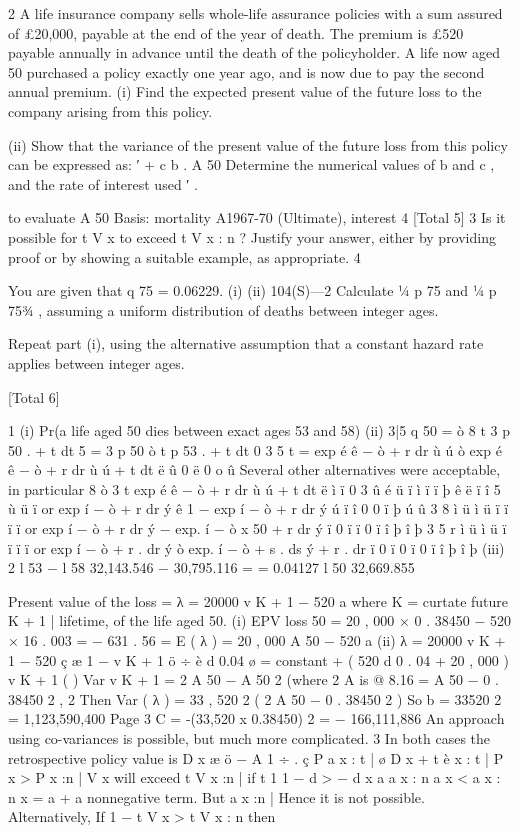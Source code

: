\documentclass[a4paper,12pt]{article}
\begin{document}
2
A life insurance company sells whole-life assurance policies with a sum assured of
£20,000, payable at the end of the year of death. The premium is £520 payable
annually in advance until the death of the policyholder.
A life now aged 50 purchased a policy exactly one year ago, and is now due to pay
the second annual premium.
(i) Find the expected present value of the future loss to the company arising
from this policy.

(ii) Show that the variance of the present value of the future loss from this
policy can be expressed as:
′ + c
b . A 50
Determine the numerical values of b and c , and the rate of interest used
′ .

to evaluate A 50
Basis: mortality A1967-70 (Ultimate), interest 4%
[Total 5]
3
Is it possible for t V x to exceed t V x : n ? Justify your answer, either by providing
proof or by showing a suitable example, as appropriate.
4

You are given that q 75 = 0.06229.
(i)
(ii)
104(S)—2
Calculate 1⁄4 p 75 and 1⁄4 p 753⁄4 , assuming a uniform distribution of deaths
between integer ages.

Repeat part (i), using the alternative assumption that a constant hazard
rate applies between integer ages.

[Total 6]



1
(i) Pr(a life aged 50 dies between exact ages 53 and 58)
(ii) 3|5 q 50
= ò
8
t
3
p 50 .  + t dt
5
= 3 p 50 ò t p 53 .  + t dt
0
3
5
t
= exp é ê − ò  + r dr ù ú ò exp é ê − ò  + r dr ù ú  + t dt
ë
û
0
ë
0
o
û
Several other alternatives were acceptable, in particular
8
ò 3
t
exp é ê − ò  + r dr ù ú  + t dt
ë
ì
ï
0
3
û
é
ü
ï ì
ï
ï
þ ê
ë ï
î
5
ù
ü
ï
or exp í − ò  + r dr ý ê 1 − exp í − ò  + r dr ý ú
ï
î
0
0
ï
þ ú
û
3
8
ì
ü
ì
ü
ï
ï
ï
ï
or exp í − ò  + r dr ý − exp. í − ò \mu x 50 + r dr ý
ï 0
ï
ï 0
ï
î
þ
î
þ
3
5
r
ì
ü
ì
ü
ï
ï
ï
ï
or exp í − ò  + r . dr ý ò exp. í − ò  + s . ds ý  + r . dr
ï 0
ï 0
ï 0
ï
î
þ
î
þ
(iii)
2
l 53 − l 58 32,143.546 − 30,795.116
=
= 0.04127
l 50
32,669.855
 
Present value of the loss = λ = 20000 v K + 1 − 520 a
where K = curtate future
K + 1 |
lifetime, of the life aged 50.
(i) EPV loss
  50 = 20 , 000 × 0 . 38450 − 520 × 16 . 003 = − 631 . 56
= Ε ( λ ) = 20 , 000 A 50 − 520 a
(ii) λ = 20000 v K + 1 − 520 ç
æ 1 − v K + 1 ö
÷
è d 0.04 ø
= constant + ( 520 d 0 . 04 + 20 , 000 ) v K + 1
(
)
Var v K + 1 = 2 A 50 − A 50 2 (where 2 A is @ 8.16%
= A 50 − 0 . 38450 2 ,
2
Then Var ( λ ) = 33 , 520 2
(
2
A 50 − 0 . 38450 2
)
So b = 33520 2 = 1,123,590,400
Page 3%
C = -(33,520 x 0.38450) 2 = − 166,111,886
An approach using co-variances is possible, but much more complicated.
3
In both cases the retrospective policy value is
D x æ
ö
  − A 1 ÷ .
ç P a
x : t | ø
D x + t è x : t |
P x > P x :n |
V x will exceed t V x :n | if
t
1
1
− d >
− d
 x
a
a  x : n
a  x < a  x : n
  x = a
  + a nonnegative term.
But a
x :n |
Hence it is not possible.
Alternatively,
If
1 −
t V x
> t V x : n then
\end{document}
